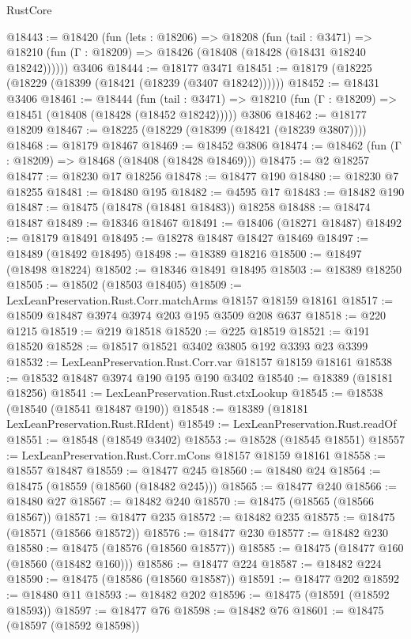 \begin{lexlean}{RustCore}
\begin{coremodule}
@18443 := @18420
    (fun (lets : @18206) =>
    @18208
      (fun (tail : @3471) =>
      @18210 (fun (Γ : @18209) => @18426 (@18408 (@18428 (@18431 @18240 @18242))))))
    @3406
@18444 := @18177 @3471
@18451 := @18179 (@18225 (@18229 (@18399 (@18421 (@18239 (@3407 @18242))))))
@18452 := @18431 @3406
@18461 := @18444
    (fun (tail : @3471) => @18210 (fun (Γ : @18209) => @18451 (@18408 (@18428 (@18452 @18242)))))
    @3806
@18462 := @18177 @18209
@18467 := @18225 (@18229 (@18399 (@18421 (@18239 @3807))))
@18468 := @18179 @18467
@18469 := @18452 @3806
@18474 := @18462 (fun (Γ : @18209) => @18468 (@18408 (@18428 @18469)))
@18475 := @2 @18257
@18477 := @18230 @17 @18256
@18478 := @18477 @190
@18480 := @18230 @7 @18255
@18481 := @18480 @195
@18482 := @4595 @17
@18483 := @18482 @190
@18487 := @18475 (@18478 (@18481 @18483)) @18258
@18488 := @18474 @18487
@18489 := @18346 @18467
@18491 := @18406 (@18271 @18487)
@18492 := @18179 @18491
@18495 := @18278 @18487 @18427 @18469
@18497 := @18489 (@18492 @18495)
@18498 := @18389 @18216
@18500 := @18497 (@18498 @18224)
@18502 := @18346 @18491 @18495
@18503 := @18389 @18250
@18505 := @18502 (@18503 @18405)
@18509 := LexLeanPreservation.Rust.Corr.matchArms @18157 @18159 @18161
@18517 := @18509 @18487 @3974 @3974 @203 @195 @3509 @208 @637
@18518 := @220 @1215
@18519 := @219 @18518
@18520 := @225 @18519
@18521 := @191 @18520
@18528 := @18517 @18521 @3402 @3805 @192 @3393 @23 @3399
@18532 := LexLeanPreservation.Rust.Corr.var @18157 @18159 @18161
@18538 := @18532 @18487 @3974 @190 @195 @190 @3402
@18540 := @18389 (@18181 @18256)
@18541 := LexLeanPreservation.Rust.ctxLookup
@18545 := @18538 (@18540 (@18541 @18487 @190))
@18548 := @18389 (@18181 LexLeanPreservation.Rust.RIdent)
@18549 := LexLeanPreservation.Rust.readOf
@18551 := @18548 (@18549 @3402)
@18553 := @18528 (@18545 @18551)
@18557 := LexLeanPreservation.Rust.Corr.mCons @18157 @18159 @18161
@18558 := @18557 @18487
@18559 := @18477 @245
@18560 := @18480 @24
@18564 := @18475 (@18559 (@18560 (@18482 @245)))
@18565 := @18477 @240
@18566 := @18480 @27
@18567 := @18482 @240
@18570 := @18475 (@18565 (@18566 @18567))
@18571 := @18477 @235
@18572 := @18482 @235
@18575 := @18475 (@18571 (@18566 @18572))
@18576 := @18477 @230
@18577 := @18482 @230
@18580 := @18475 (@18576 (@18560 @18577))
@18585 := @18475 (@18477 @160 (@18560 (@18482 @160)))
@18586 := @18477 @224
@18587 := @18482 @224
@18590 := @18475 (@18586 (@18560 @18587))
@18591 := @18477 @202
@18592 := @18480 @11
@18593 := @18482 @202
@18596 := @18475 (@18591 (@18592 @18593))
@18597 := @18477 @76
@18598 := @18482 @76
@18601 := @18475 (@18597 (@18592 @18598))

\end{coremodule}
\end{lexlean}

